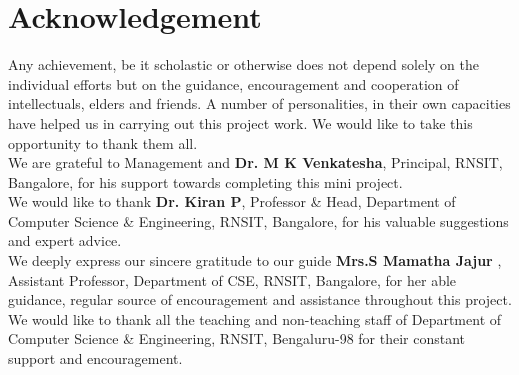 \chapter*{Acknowledgement}%
%

Any achievement, be it scholastic or otherwise does not depend solely on the individual 
efforts but on the guidance, encouragement and cooperation of intellectuals, elders and 
friends. A number of personalities, in their own capacities have helped us in carrying out 
this project work. We would like to take this opportunity to thank them all.\\
We are grateful to Management and \textbf{Dr. M K Venkatesha}, Principal, RNSIT, Bangalore, for his 
support towards completing this mini project.\\
We would like to thank \textbf{Dr. Kiran P}, Professor \& Head, Department of Computer 
Science \& Engineering, RNSIT, Bangalore, for his valuable suggestions and expert advice.\\
We deeply express our sincere gratitude to our guide \textbf{Mrs.S Mamatha Jajur }, Assistant 
Professor, Department of CSE, RNSIT, Bangalore, for her able guidance, regular source of 
encouragement and assistance throughout this project. \\
We would like to thank all the teaching and non-teaching staff of Department of 
Computer Science \& Engineering, RNSIT, Bengaluru-98 for their constant support and encouragement.

\thispagestyle{plain}

